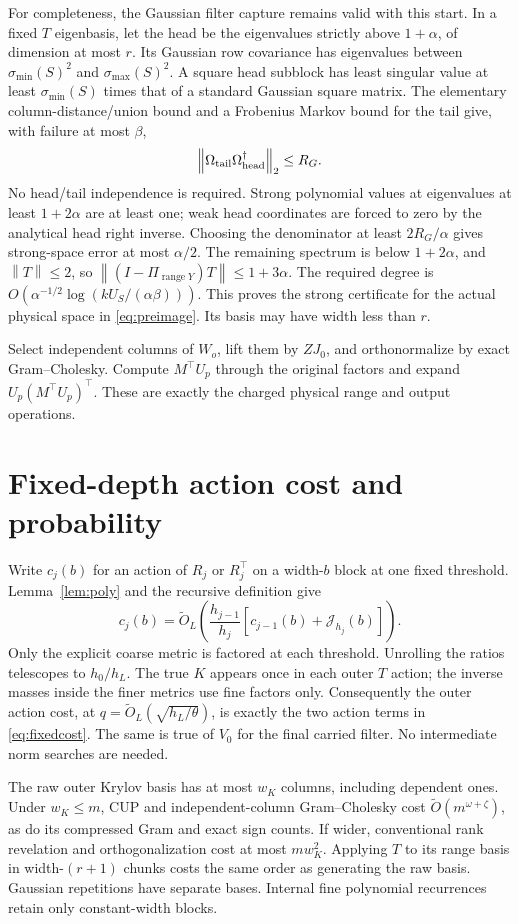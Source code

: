 \documentclass[11pt]{article}
\newcommand{\norm}[1]{\left\lVert#1\right\rVert}
\newcommand{\range}{\operatorname{range}}
\newcommand{\tO}{\widetilde O}
\newcommand{\Jc}{\mathcal J}
\begin{document}
For completeness, the Gaussian filter capture remains valid with this
start. In a fixed \(T\) eigenbasis, let the head be the eigenvalues
strictly above \(1+\alpha\), of dimension at most \(r\). Its Gaussian
row covariance has eigenvalues between \(\sigma_{\min}(S)^2\) and
\(\sigma_{\max}(S)^2\). A square head subblock has least singular
value at least \(\sigma_{\min}(S)\) times that of a standard Gaussian
square matrix. The elementary column-distance/union bound and a
Frobenius Markov bound for the tail give, with failure at most \(\beta\),
\[
 \norm{\Omega_{\rm tail}\Omega_{\rm head}^\dagger}_2
\leq R_G.
\]
No head/tail independence is required. Strong polynomial values at
eigenvalues at least \(1+2\alpha\) are at least one; weak head
coordinates are forced to zero by the analytical head right inverse.
Choosing the denominator at least \(2R_G/\alpha\)
gives strong-space error at most \(\alpha/2\). The remaining spectrum
is below \(1+2\alpha\), and \(\norm T\leq2\), so
\(\norm{(I-\Pi_{\range Y})T}\leq1+3\alpha\).
The required degree is
\(O(\alpha^{-1/2}\log(kU_S/(\alpha\beta)))\).
This proves the strong certificate for the actual physical space in
\eqref{eq:preimage}. Its basis may have width less than \(r\).

Select independent columns of \(W_o\), lift them by \(ZJ_0\), and
orthonormalize by exact Gram--Cholesky. Compute \(M^\top U_p\) through
the original factors and expand \(U_p(M^\top U_p)^\top\).
These are exactly the charged physical range and output operations.

\section{Fixed-depth action cost and probability}
Write \(c_j(b)\) for an action of \(R_j\) or \(R_j^\top\) on a
width-\(b\) block at one fixed threshold. Lemma~\ref{lem:poly} and
the recursive definition give
\[
 c_j(b)=\tO_L\!\left(\frac{h_{j-1}}{h_j}
                   [c_{j-1}(b)+\Jc_{h_j}(b)]\right).
\]
Only the explicit coarse metric is factored at each threshold.
Unrolling the ratios telescopes to \(h_0/h_L\). The true \(K\)
appears once in each outer \(T\) action; the inverse masses inside
the finer metrics use fine factors only. Consequently the outer action
cost, at \(q=\tO_L(\sqrt{h_L/\theta})\), is exactly the two action
terms in \eqref{eq:fixedcost}. The same is true of \(V_0\) for the
final carried filter. No intermediate norm searches are needed.

The raw outer Krylov basis has at most \(w_K\) columns, including
dependent ones. Under \(w_K\leq m\), CUP and independent-column
Gram--Cholesky cost \(\tO(m^{\omega+\zeta})\), as do its compressed
Gram and exact sign counts. If wider, conventional rank revelation and
orthogonalization cost at most \(m w_K^2\). Applying \(T\) to its
range basis in width-\((r+1)\) chunks costs the same order as generating
the raw basis. Gaussian repetitions have separate bases. Internal fine
polynomial recurrences retain only constant-width blocks.
\end{document}
